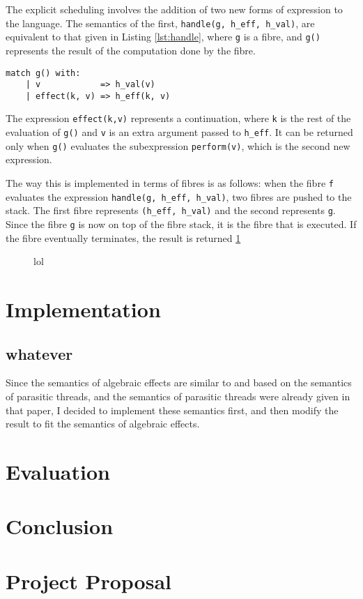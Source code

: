 \documentclass[12pt,a4paper,twoside,openright]{report}
\begin{document}
The explicit scheduling involves the addition of two new forms of expression to the language. The semantics of the first, \texttt{handle(g, h\_eff, h\_val)}, are equivalent to that given in Listing \ref{lst:handle}, where \texttt{g} is a fibre, and \texttt{g()} represents the result of the computation done by the fibre.

\begin{lstlisting}[caption=The semantics of \texttt{handle},label={lst:handle}]
  match g() with:
    | v            => h_val(v)
    | effect(k, v) => h_eff(k, v)
\end{lstlisting}

The expression \texttt{effect(k,v)} represents a continuation, where \texttt{k} is the rest of the evaluation of \texttt{g()} and \texttt{v} is an extra argument passed to \texttt{h\_eff}. It can be returned only when \texttt{g()} evaluates the subexpression \texttt{perform(v)}, which is the second new expression.

The way this is implemented in terms of fibres is as follows: when the fibre \texttt{f} evaluates the expression \texttt{handle(g, h\_eff, h\_val)}, two fibres are pushed to the stack. The first fibre represents \texttt{(h\_eff, h\_val)} and the second represents \texttt{g}. Since the fibre \texttt{g} is now on top of the fibre stack, it is the fibre that is executed. If the fibre eventually terminates, the result is returned \ref{fig:lmao}

\begin{figure}
\centering
\caption{lol}
\label{fig:lmao}
\end{figure}

\chapter{Implementation}

\section{whatever}

Since the semantics of algebraic effects are similar to and based on the semantics of parasitic threads, and the semantics of parasitic threads were already given in that paper, I decided to implement these semantics first, and then modify the result to fit the semantics of algebraic effects.



\chapter{Evaluation}

\chapter{Conclusion}


\appendix

\chapter{Project Proposal}
\end{document}
